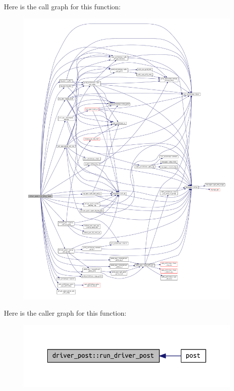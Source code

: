 Here is the call graph for this function\+:
\nopagebreak
\begin{figure}[H]
\begin{center}
\leavevmode
\includegraphics[width=350pt]{namespacedriver__post_a33b3c6f9018a0ddc92dce77394b8ab37_cgraph}
\end{center}
\end{figure}
Here is the caller graph for this function\+:
\nopagebreak
\begin{figure}[H]
\begin{center}
\leavevmode
\includegraphics[width=342pt]{namespacedriver__post_a33b3c6f9018a0ddc92dce77394b8ab37_icgraph}
\end{center}
\end{figure}
\mbox{\label{namespacedriver__post_aba7a645f4dd2e08db109cefc6ce0df86}} 
